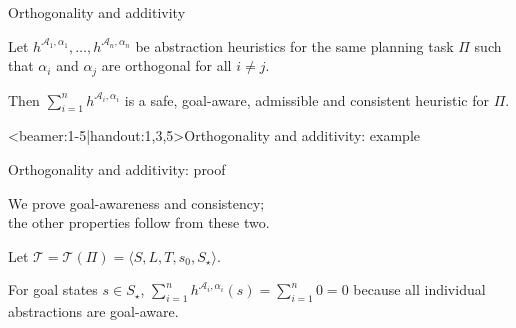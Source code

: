 \documentclass{gkibeamer}
\begin{document}
\begin{frame}{Orthogonality and additivity}
  \begin{theorem}
    Let $h^{\mathcal A_1, \alpha_1}, \dots, h^{\mathcal A_n,
    \alpha_n}$ be abstraction heuristics for the same planning task $\Pi$
    such that $\alpha_i$ and $\alpha_j$ are orthogonal for all
    $i \neq j$.

    Then $\sum_{i=1}^n h^{\mathcal A_i, \alpha_i}$ is a safe,
    goal-aware, admissible and consistent heuristic for $\Pi$.
  \end{theorem}
\end{frame}

\begin{frame}<beamer:1-5|handout:1,3,5>{Orthogonality and additivity: example}
  \begin{center}

    \bigskip

  \end{center}
\end{frame}

\begin{frame}{Orthogonality and additivity: proof}
  \begin{proofstart}
    We prove goal-awareness and consistency; \\
    the other properties follow from these two.

    \smallskip

    Let $\mathcal T = \mathcal T(\Pi) = \langle S, L, T, s_0, S_\star\rangle$.

    \pause
    \smallskip

     For goal states $s \in S_\star$,
    $\sum_{i=1}^n h^{\mathcal A_i, \alpha_i}(s) = \sum_{i=1}^n 0 = 0$
    because all individual abstractions are goal-aware.
  \end{proofstart}
\end{frame}
\end{document}
